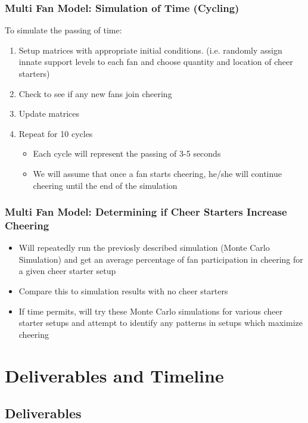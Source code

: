 \documentclass[compress,handout,10pt]{beamer}
\let\olditem\item
\renewcommand{\item}{\setlength{\itemsep}{0.5\baselineskip}\olditem}
\begin{document}
\begin{frame}
\frametitle{Multi Fan Model: Simulation of Time (Cycling)}
To simulate the passing of time:
	\begin {enumerate}
		\item Setup matrices with appropriate initial conditions. (i.e. randomly assign innate support levels to each fan and choose quantity and location of cheer starters)
		\item Check to see if any new fans join cheering
		\item Update matrices
		\item Repeat for 10 cycles
	\begin {itemize}
		\item Each cycle will represent the passing of 3-5 seconds
		\item We will assume that once a fan starts cheering, he/she will continue cheering until the end of the simulation
	\end{itemize}
	\end {enumerate}
\end{frame}

\begin{frame}
\frametitle{Multi Fan Model: Determining if Cheer Starters Increase Cheering}
\begin{itemize}
	\item Will repeatedly run the previosly described simulation (Monte Carlo Simulation) and get an average percentage of fan participation in cheering for a given cheer starter setup
	\item Compare this to simulation results with no cheer starters
	\item If time permits, will try these Monte Carlo simulations for various cheer starter setups and attempt to identify any patterns in setups which maximize cheering 
\end{itemize}
\end{frame}

\section {Deliverables and Timeline}

\subsection{Deliverables}
\end{document}
